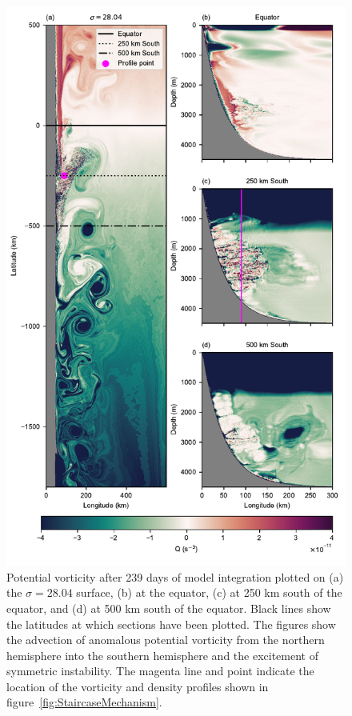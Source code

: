 \begin{figure}[hp]
    \centering
    \includegraphics{../figures/Figure4.pdf}
    \caption{Potential vorticity after 239 days of model integration plotted on (a) the $\sigma = 28.04$ surface, (b) at the equator, (c) at 250 km south of the equator, and (d) at 500 km south of the equator. Black lines show the latitudes at which sections have been plotted. The figures show the advection of anomalous potential vorticity from the northern hemisphere into the southern hemisphere and the excitement of symmetric instability. The magenta line and point indicate the location of the vorticity and density profiles shown in figure~\ref{fig:StaircaseMechanism}.}
    \label{fig:PV}
\end{figure}

